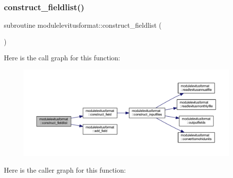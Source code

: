 \subsubsection{\texorpdfstring{construct\+\_\+fieldlist()}{construct\_fieldlist()}}
{\footnotesize\ttfamily subroutine modulelevitusformat\+::construct\+\_\+fieldlist (\begin{DoxyParamCaption}{ }\end{DoxyParamCaption})\hspace{0.3cm}{\ttfamily [private]}}

Here is the call graph for this function\+:\nopagebreak
\begin{figure}[H]
\begin{center}
\leavevmode
\includegraphics[width=350pt]{namespacemodulelevitusformat_a283a6fb7f680ba1855b1e20b95906146_cgraph}
\end{center}
\end{figure}
Here is the caller graph for this function\+:\nopagebreak

